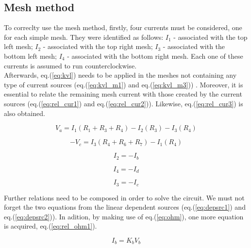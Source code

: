 \subsection{Mesh method}
\label{subsec:mesh_met}

To correclty use the mesh method, firstly, four currents must be considered, one for each simple mesh.
They were identified as follows: $I_1$ - associated with the top left mesh; $I_2$ - associated with
the top right mesh; $I_3$ - associated with the bottom left mesh; $I_4$ - associated with the bottom
right mesh. Each one of these currents is assumed to run counterclockwise. \\

Afterwards, eq.(\ref{eq:kvl}) needs to be applied in the meshes not containing any type of current
sources (eq.(\ref{eq:kvl_m1}) and eq.(\ref{eq:kvl_m3})) . Moreover, it is essential to relate the
remaining mesh current with those created by the current sources (eq.(\ref{eq:rel_cur1}) and
eq.(\ref{eq:rel_cur2})). Likewise, eq.(\ref{eq:rel_cur3}) is also obtained.

\begin{equation}
	V_a = I_1(R_1+R_3+R_4)-I_2(R_3)-I_3(R_4)
	\label{eq:kvl_m1}
\end{equation}

\begin{equation}
	-V_c = I_3(R_4+R_6+R_7)-I_1(R_4)
	\label{eq:kvl_m3}
\end{equation}

\begin{equation}
	I_2 = -I_b
	\label{eq:rel_cur1}
\end{equation}

\begin{equation}
	I_4 = -I_d
	\label{eq:rel_cur2}
\end{equation}

\begin{equation}
	I_3 = -I_c
	\label{eq:rel_cur3}
\end{equation}

Further relations need to be composed in order to solve the circuit. We must not forget the two equations
from the linear dependent sources (eq.(\ref{eq:depsrc1}) and eq.(\ref{eq:depsrc2})). In adition, by
making use of eq.(\ref{eq:ohm}), one more equation is acquired, eq.(\ref{eq:rel_ohm1}).

\begin{equation}
	I_b = K_bV_b
	\label{eq:depsrc1}
\end{equation}

